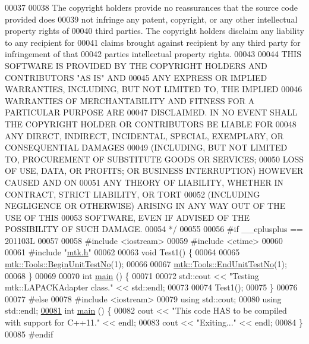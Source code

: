 \begin{DoxyCode}
00037 \textcolor{comment}{}
00038 \textcolor{comment}{The copyright holders provide no reassurances that the source code provided does}
00039 \textcolor{comment}{not infringe any patent, copyright, or any other intellectual property rights of}
00040 \textcolor{comment}{third parties. The copyright holders disclaim any liability to any recipient for}
00041 \textcolor{comment}{claims brought against recipient by any third party for infringement of that}
00042 \textcolor{comment}{parties intellectual property rights.}
00043 \textcolor{comment}{}
00044 \textcolor{comment}{THIS SOFTWARE IS PROVIDED BY THE COPYRIGHT HOLDERS AND CONTRIBUTORS "AS IS" AND}
00045 \textcolor{comment}{ANY EXPRESS OR IMPLIED WARRANTIES, INCLUDING, BUT NOT LIMITED TO, THE IMPLIED}
00046 \textcolor{comment}{WARRANTIES OF MERCHANTABILITY AND FITNESS FOR A PARTICULAR PURPOSE ARE}
00047 \textcolor{comment}{DISCLAIMED. IN NO EVENT SHALL THE COPYRIGHT HOLDER OR CONTRIBUTORS BE LIABLE FOR}
00048 \textcolor{comment}{ANY DIRECT, INDIRECT, INCIDENTAL, SPECIAL, EXEMPLARY, OR CONSEQUENTIAL DAMAGES}
00049 \textcolor{comment}{(INCLUDING, BUT NOT LIMITED TO, PROCUREMENT OF SUBSTITUTE GOODS OR SERVICES;}
00050 \textcolor{comment}{LOSS OF USE, DATA, OR PROFITS; OR BUSINESS INTERRUPTION) HOWEVER CAUSED AND ON}
00051 \textcolor{comment}{ANY THEORY OF LIABILITY, WHETHER IN CONTRACT, STRICT LIABILITY, OR TORT}
00052 \textcolor{comment}{(INCLUDING NEGLIGENCE OR OTHERWISE) ARISING IN ANY WAY OUT OF THE USE OF THIS}
00053 \textcolor{comment}{SOFTWARE, EVEN IF ADVISED OF THE POSSIBILITY OF SUCH DAMAGE.}
00054 \textcolor{comment}{*/}
00055 
00056 \textcolor{preprocessor}{#if \_\_cplusplus == 201103L}
00057 
00058 \textcolor{preprocessor}{#include <iostream>}
00059 \textcolor{preprocessor}{#include <ctime>}
00060 
00061 \textcolor{preprocessor}{#include "\hyperlink{mtk_8h}{mtk.h}"}
00062 
00063 \textcolor{keywordtype}{void} Test1() \{
00064 
00065   \hyperlink{classmtk_1_1Tools_afc29ecaf337a13ed2e817d3890a5a441}{mtk::Tools::BeginUnitTestNo}(1);
00066 
00067   \hyperlink{classmtk_1_1Tools_aba67d9dc35c9c1c49430fcc9ea035e03}{mtk::Tools::EndUnitTestNo}(1);
00068 \}
00069 
00070 \textcolor{keywordtype}{int} \hyperlink{mtk__lapack__adapter__test_8cc_ae66f6b31b5ad750f1fe042a706a4e3d4}{main} () \{
00071 
00072   std::cout << \textcolor{stringliteral}{"Testing mtk::LAPACKAdapter class."} << std::endl;
00073 
00074   Test1();
00075 \}
00076 
00077 \textcolor{preprocessor}{#else}
00078 \textcolor{preprocessor}{#include <iostream>}
00079 \textcolor{keyword}{using} std::cout;
00080 \textcolor{keyword}{using} std::endl;
\hypertarget{mtk__lapack__adapter__test_8cc_source_l00081}{}\hyperlink{mtk__lapack__adapter__test_8cc_ae66f6b31b5ad750f1fe042a706a4e3d4}{00081} \textcolor{keywordtype}{int} \hyperlink{mtk__lapack__adapter__test_8cc_ae66f6b31b5ad750f1fe042a706a4e3d4}{main} () \{
00082   cout << \textcolor{stringliteral}{"This code HAS to be compiled with support for C++11."} << endl;
00083   cout << \textcolor{stringliteral}{"Exiting..."} << endl;
00084 \}
00085 \textcolor{preprocessor}{#endif}
\end{DoxyCode}
